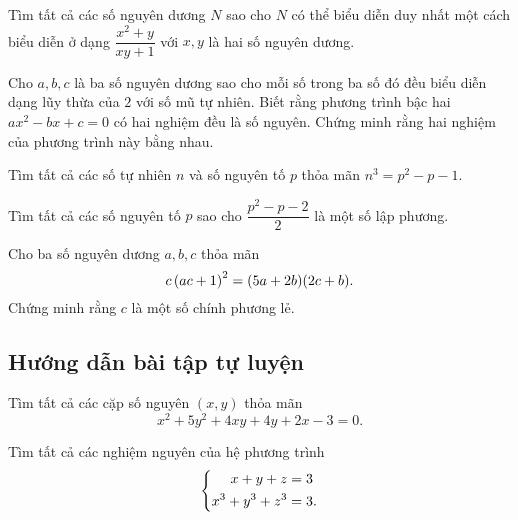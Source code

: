 \begin{btt}
Tìm tất cả các số nguyên dương $N$ sao cho $N$ có thể biểu diễn duy nhất một cách biểu diễn ở dạng $\dfrac{x^2+y}{xy+1}$ với $x,y$ là hai số nguyên dương.
\end{btt}

\begin{btt}
Cho $a,b,c$ là ba số nguyên dương sao cho mỗi số trong ba số đó đều biểu diễn dạng lũy thừa của $2$ với số mũ tự nhiên. Biết rằng phương trình bậc hai $ax^2-bx+c=0$ có hai nghiệm đều là số nguyên. Chứng minh rằng hai nghiệm của phương trình này bằng nhau.
\end{btt}

\begin{btt}
Tìm tất cả các số tự nhiên $n$ và số nguyên tố $p$ thỏa mãn $n^3=p^2-p-1.$
\end{btt}

\begin{btt}
Tìm tất cả các số nguyên tố $p$ sao cho $\dfrac{p^2-p-2}{2}$ là một số lập phương.
\end{btt}

\begin{btt}
Cho ba số nguyên dương $a,b,c$ thỏa mãn $$c\left(\displaystyle ac+1 \right)^2=(5a+2b)(2c+b).$$
Chứng minh rằng $c$ là một số chính phương lẻ.
\end{btt}

\subsection*{Hướng dẫn bài tập tự luyện}

\begin{gbtt}
Tìm tất cả các cặp số nguyên $(x,y)$ thỏa mãn
$$x^2+5y^2+4xy+4y+2x-3=0.$$
\end{gbtt}

\begin{gbtt}
Tìm tất cả các nghiệm nguyên của hệ phương trình
$$\left\{\begin{aligned}x+y+z&=3 \\ x^3+y^3+z^3&=3.\end{aligned}\right.$$
\end{gbtt}


